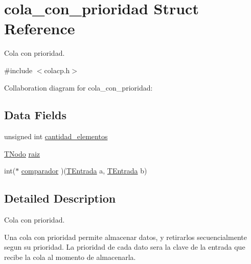 \hypertarget{structcola__con__prioridad}{\section{cola\+\_\+con\+\_\+prioridad Struct Reference}
\label{structcola__con__prioridad}
}


Cola con prioridad.  




{\ttfamily \#include $<$colacp.\+h$>$}



Collaboration diagram for cola\+\_\+con\+\_\+prioridad\+:
\subsection*{Data Fields}
\begin{DoxyCompactItemize}
\item 
unsigned int \hyperlink{structcola__con__prioridad_acd8b855e03140913076aacb735478691}{cantidad\+\_\+elementos}
\item 
\hyperlink{colacp_8h_a960347aa4d3ee4fbca69f1f83fd41afb}{T\+Nodo} \hyperlink{structcola__con__prioridad_a0d06fd877a9e6da6cd8bad02a32e5f46}{raiz}
\item 
int($\ast$ \hyperlink{structcola__con__prioridad_a495cd3ba00929a2e0efb52c2807a86a1}{comparador} )(\hyperlink{colacp_8h_ad68b19b2fd7a87dd871dc67b308824df}{T\+Entrada} a, \hyperlink{colacp_8h_ad68b19b2fd7a87dd871dc67b308824df}{T\+Entrada} b)
\end{DoxyCompactItemize}


\subsection{Detailed Description}
Cola con prioridad. 

Una cola con prioridad permite almacenar datos, y retirarlos secuencialmente segun su prioridad. La prioridad de cada dato sera la clave de la entrada que recibe la cola al momento de almacenarla. 

